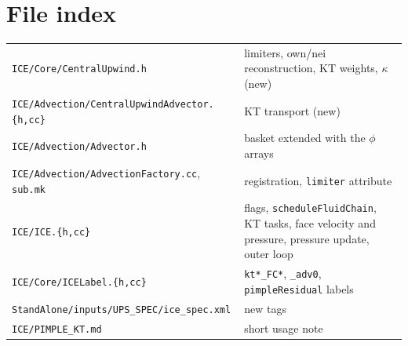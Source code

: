 \documentclass[11pt]{article}
\newcommand{\code}[1]{\texttt{\small #1}}
\newcommand{\file}[1]{\texttt{\small\color{Moss}#1}}
\begin{document}
\section*{File index}
\begin{center}
\small
\begin{tabularx}{\linewidth}{@{}l X@{}}
\toprule
\file{ICE/Core/CentralUpwind.h} & limiters, own/nei reconstruction, KT weights, $\kappa$ (new) \\
\file{ICE/Advection/CentralUpwindAdvector.\{h,cc\}} & KT transport (new) \\
\file{ICE/Advection/Advector.h} & basket extended with the $\phi$ arrays \\
\file{ICE/Advection/AdvectionFactory.cc}, \file{sub.mk} & registration, \code{limiter} attribute \\
\file{ICE/ICE.\{h,cc\}} & flags, \code{scheduleFluidChain}, KT tasks, face velocity and pressure, pressure update, outer loop \\
\file{ICE/Core/ICELabel.\{h,cc\}} & \code{kt*\_FC*}, \code{*\_adv0}, \code{pimpleResidual} labels \\
\file{StandAlone/inputs/UPS\_SPEC/ice\_spec.xml} & new tags \\
\file{ICE/PIMPLE\_KT.md} & short usage note \\
\bottomrule
\end{tabularx}
\end{center}
\end{document}
